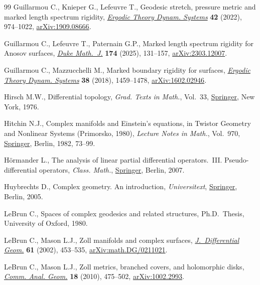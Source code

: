 \begin{thebibliography}{99}
Guillarmou C., Knieper G., Lefeuvre T., Geodesic stretch, pressure metric and
 marked length spectrum rigidity,
 \href{https://doi.org/10.1017/etds.2021.75}{\textit{Ergodic Theory Dynam.
 Systems}} \textbf{42} (2022), 974--1022,
 \href{http://arxiv.org/abs/1909.08666}{arXiv:1909.08666}.

Guillarmou C., Lefeuvre T., Paternain G.P., Marked length spectrum rigidity for
 {A}nosov surfaces,
 \href{https://doi.org/10.1215/00127094-2024-0022}{\textit{Duke Math.~J.}}
 \textbf{174} (2025), 131--157,
 \href{http://arxiv.org/abs/2303.12007}{arXiv:2303.12007}.

Guillarmou C., Mazzucchelli M., Marked boundary rigidity for surfaces,
 \href{https://doi.org/10.1017/etds.2016.94}{\textit{Ergodic Theory Dynam.
 Systems}} \textbf{38} (2018), 1459--1478,
 \href{http://arxiv.org/abs/1602.02946}{arXiv:1602.02946}.

Hirsch M.W., Differential topology, \textit{Grad. Texts in Math.}, Vol.~33,
 \href{https://doi.org/10.1007/978-1-4684-9449-5}{Springer}, New York, 1976.

Hitchin N.J., Complex manifolds and {E}instein's equations, in Twistor
 {G}eometry and {N}onlinear {S}ystems ({P}rimorsko, 1980), \textit{Lecture
 Notes in Math.}, Vol.~970,
 \href{https://doi.org/10.1007/BFb0066025}{Springer}, Berlin, 1982, 73--99.

H\"ormander L., The analysis of linear partial differential operators.~{III}.
 Pseudo-differential operators, \textit{Class. Math.},
 \href{https://doi.org/10.1007/978-3-540-49938-1}{Springer}, Berlin, 2007.

Huybrechts D., Complex geometry. An introduction, \textit{Universitext},
 \href{https://doi.org/10.1007/b137952}{Springer}, Berlin, 2005.

LeBrun C., Spaces of complex geodesics and related structures, Ph.D.~Thesis,
 {U}niversity of Oxford, 1980.

LeBrun C., Mason L.J., Zoll manifolds and complex surfaces,
 \href{https://doi.org/10.4310/jdg/1090351530}{\textit{J.~Differential Geom.}}
 \textbf{61} (2002), 453--535,
 \href{http://arxiv.org/abs/math.DG/0211021}{arXiv:math.DG/0211021}.

LeBrun C., Mason L.J., Zoll metrics, branched covers, and holomorphic disks,
 \href{https://doi.org/10.4310/CAG.2010.v18.n3.a3}{\textit{Comm. Anal. Geom.}}
 \textbf{18} (2010), 475--502,
 \href{http://arxiv.org/abs/1002.2993}{arXiv:1002.2993}.


\end{thebibliography}

